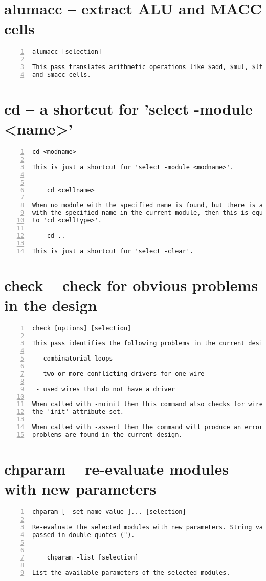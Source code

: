 \section{alumacc -- extract ALU and MACC cells}
\label{cmd:alumacc}
\begin{lstlisting}[numbers=left,frame=single]
    alumacc [selection]

This pass translates arithmetic operations like $add, $mul, $lt, etc. to $alu
and $macc cells.
\end{lstlisting}

\section{cd -- a shortcut for 'select -module <name>'}
\label{cmd:cd}
\begin{lstlisting}[numbers=left,frame=single]
    cd <modname>

This is just a shortcut for 'select -module <modname>'.


    cd <cellname>

When no module with the specified name is found, but there is a cell
with the specified name in the current module, then this is equivalent
to 'cd <celltype>'.

    cd ..

This is just a shortcut for 'select -clear'.
\end{lstlisting}

\section{check -- check for obvious problems in the design}
\label{cmd:check}
\begin{lstlisting}[numbers=left,frame=single]
    check [options] [selection]

This pass identifies the following problems in the current design:

 - combinatorial loops

 - two or more conflicting drivers for one wire

 - used wires that do not have a driver

When called with -noinit then this command also checks for wires which have
the 'init' attribute set.

When called with -assert then the command will produce an error if any
problems are found in the current design.
\end{lstlisting}

\section{chparam -- re-evaluate modules with new parameters}
\label{cmd:chparam}
\begin{lstlisting}[numbers=left,frame=single]
    chparam [ -set name value ]... [selection]

Re-evaluate the selected modules with new parameters. String values must be
passed in double quotes (").


    chparam -list [selection]

List the available parameters of the selected modules.
\end{lstlisting}

